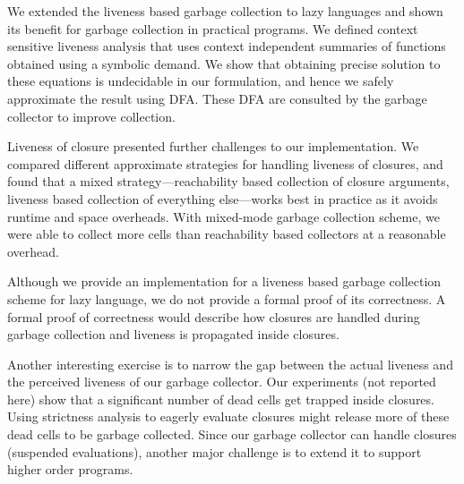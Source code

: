\documentclass[9pt]{sigplanconf}
\begin{document}

We extended the liveness based garbage collection to lazy
  languages and shown its benefit  for garbage collection in practical
  programs. We  defined context  sensitive liveness analysis  that uses
  context independent summaries of functions obtained using a symbolic
  demand. We show  that obtaining precise solution  to these equations
  is undecidable in  our formulation, and hence  we safely approximate
  the result using DFA. These DFA are consulted by the garbage collector
  to improve  collection.

  Liveness   of   closure   presented  further   challenges   to   our
  implementation.   We compared  different approximate  strategies for
  handling   liveness   of   closures,   and  found   that   a   mixed
  strategy---reachability  based  collection   of  closure  arguments,
  liveness  based  collection  of   everything  else---works  best  in
  practice as it  avoids runtime and space  overheads.  With mixed-mode
  garbage collection scheme,  we were able to collect  more cells than
  reachability based collectors at a reasonable overhead.

  Although we  provide an  implementation for  a liveness  based garbage
  collection scheme for lazy language, we  do not provide a formal proof
  of its correctness.  A formal  proof of correctness would describe how
  closures  are  handled  during  garbage  collection  and  liveness  is
  propagated inside closures. 

  Another interesting exercise is to narrow the gap between the actual
  liveness and  the perceived liveness  of our garbage  collector. Our
  experiments (not  reported here) show  that a significant  number of
  dead cells  get trapped inside closures.   Using strictness analysis
  to eagerly evaluate closures might  release more of these dead cells
  to be  garbage collected.   Since our  garbage collector  can handle
  closures  (suspended evaluations),  another  major  challenge is  to
  extend it to support higher order programs.
\end{document}
